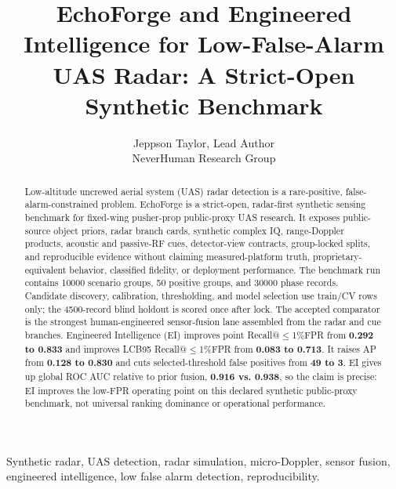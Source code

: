 \documentclass[10pt,journal]{IEEEtran}
\makeatletter
\newcommand{\kpigain}[1]{\textbf{\textcolor{EchoGain}{#1}}}
\newcommand{\kpicaveat}[1]{\textbf{\textcolor{EchoWarn}{#1}}}
\newcommand{\PrimaryKPI}{LCB95 Recall@$\leq$1\%FPR}
\newcommand{\PointKPI}{Recall@$\leq$1\%FPR}
\newcommand{\MetricScenarioGroups}{10000}
\newcommand{\MetricPositiveGroups}{50}
\newcommand{\MetricPhaseRecords}{30000}
\newcommand{\MetricHoldoutRecords}{4500}
\newcommand{\MetricPriorLcb}{0.083}
\newcommand{\MetricEiLcb}{0.713}
\newcommand{\MetricPriorPointRecall}{0.292}
\newcommand{\MetricEiPointRecall}{0.833}
\newcommand{\MetricPriorAP}{0.128}
\newcommand{\MetricEiAP}{0.830}
\newcommand{\MetricPriorSelectedFP}{49}
\newcommand{\MetricEiSelectedFP}{3}
\newcommand{\MetricPriorRocAuc}{0.938}
\newcommand{\MetricEiRocAuc}{0.916}
\makeatother
\begin{document}
\title{EchoForge and Engineered Intelligence for Low-False-Alarm UAS Radar: A Strict-Open Synthetic Benchmark}

\author{Jeppson Taylor, Lead Author\\
NeverHuman Research Group}

\maketitle

\begin{abstract}
Low-altitude uncrewed aerial system (UAS) radar detection is a rare-positive, false-alarm-constrained problem. EchoForge is a strict-open, radar-first synthetic sensing benchmark for fixed-wing pusher-prop public-proxy UAS research. It exposes public-source object priors, radar branch cards, synthetic complex IQ, range-Doppler products, acoustic and passive-RF cues, detector-view contracts, group-locked splits, and reproducible evidence without claiming measured-platform truth, proprietary-equivalent behavior, classified fidelity, or deployment performance. The benchmark run contains \MetricScenarioGroups{} scenario groups, \MetricPositiveGroups{} positive groups, and \MetricPhaseRecords{} phase records. Candidate discovery, calibration, thresholding, and model selection use train/CV rows only; the \MetricHoldoutRecords{}-record blind holdout is scored once after lock. The accepted comparator is the strongest human-engineered sensor-fusion lane assembled from the radar and cue branches. Engineered Intelligence (EI) improves point \PointKPI{} from \kpigain{\MetricPriorPointRecall{} to \MetricEiPointRecall{}} and improves \PrimaryKPI{} from \kpigain{\MetricPriorLcb{} to \MetricEiLcb{}}. It raises AP from \kpigain{\MetricPriorAP{} to \MetricEiAP{}} and cuts selected-threshold false positives from \kpigain{\MetricPriorSelectedFP{} to \MetricEiSelectedFP{}}. EI gives up global ROC AUC relative to prior fusion, \kpicaveat{\MetricEiRocAuc{} vs. \MetricPriorRocAuc{}}, so the claim is precise: EI improves the low-FPR operating point on this declared synthetic public-proxy benchmark, not universal ranking dominance or operational performance.
\end{abstract}

\begin{IEEEkeywords}
Synthetic radar, UAS detection, radar simulation, micro-Doppler, sensor fusion, engineered intelligence, low false alarm detection, reproducibility.
\end{IEEEkeywords}
\end{document}
